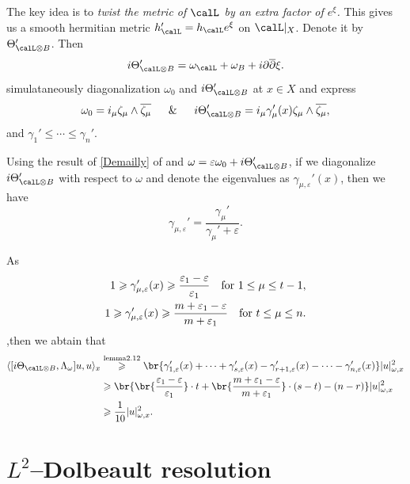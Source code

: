 \documentclass[lang=en,12pt]{beautybook}
\newcommand{\pr}{'}
\renewcommand{\bd}{\partial}
\begin{document}
The key idea is to \emph{twist the metric of $\calL$ by an extra factor of $e^\xi$.} This gives us a smooth hermitian metric $h_{\calL}\pr =h_{\calL}e^\xi$ on $\calL|_X$. Denote it by $\Theta\pr_{\calL\otimes B}$. Then
\[
  i\Theta\pr_{\calL\otimes B}=\omega_\calL +\omega_B+i\bd\bdd\xi.
\]
simulataneously diagonalization $\omega_0$ and  $i\Theta\pr_{\calL\otimes B}$ at $x\in X$ and express
\[
  \omega_0=i\sum_{\mu} \zeta_\mu\wedge\overline{\zeta_\mu}\quad\And\quad i\Theta\pr_{\calL\otimes B}=i\sum_{\mu} \gamma_\mu\pr(x)\zeta_\mu\wedge\overline{\zeta_\mu},
\]
and $\gamma_1\pr\leqslant\cdots \leqslant \gamma_n\pr $.

Using the result of \ref{Demailly} of  and $\omega=\varepsilon\omega_0+i\Theta\pr_{\calL\otimes B}$, if we diagonalize $i\Theta\pr_{\calL\otimes B}$ with respect to $\omega$ and denote the eigenvalues as $\gamma_{\mu,\varepsilon}\pr(x)$, then we have \[\gamma_{\mu,\varepsilon}\pr=\frac{\gamma_\mu\pr}{\gamma_\mu\pr+\varepsilon}.\]

As
\begin{align*}
  1\geqslant \gamma_{\mu,\varepsilon}\pr(x)\geqslant \frac{\varepsilon_1-\varepsilon}{\varepsilon_1} \text{\quad for } 1\leq \mu\leq t-1, \\
  1\geqslant \gamma_{\mu,\varepsilon}\pr(x)\geqslant \frac{m+\varepsilon_1-\varepsilon}{m+\varepsilon_1} \text{\quad for } t\leq \mu\leq n.
\end{align*}
,then we abtain that \cite{kim20232}
\begin{align*}
  \langle [i\Theta_{\calL\otimes B},\Lambda_\omega]u,u\rangle_x & \stackrel{\text{lemma2.12}}{\geqslant } \br{\gamma_{1,\varepsilon}\pr(x)+\cdots+\gamma_{s,\varepsilon}\pr(x)-\gamma_{r+1,\varepsilon}\pr(x)-\cdots-\gamma_{n,\varepsilon}\pr(x)}|u|^2_{\omega,x} \\
                                                                & \geqslant \br{\br{\frac{\varepsilon_1-\varepsilon}{\varepsilon_1}}\cdot t+\br{\frac{m+\varepsilon_1-\varepsilon}{m+\varepsilon_1}}\cdot (s-t)-(n-r)}|u|^2_{\omega,x}                             \\
                                                                & \geqslant \frac{1}{10}|u|^2_{\omega,x}.
\end{align*}

\section{\texorpdfstring{$L^2$}{}--Dolbeault resolution}
\end{document}
